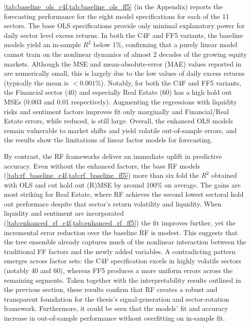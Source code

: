 \cref{tab:baseline_ols_c4f,tab:baseline_ols_ff5} (in the Appendix) reports the forecasting performance for the eight model specifications for each of the 11 sectors. The base OLS specifications provide only minimal explanatory power for daily sector level excess returns. In both the C4F and FF5 variants, the baseline models yield an in-sample $R^{2}$ below 1\%, confirming that a purely linear model cannot train on the nonlinear dynamics of almost 2 decades of the growing equity markets. Although the MSE and mean-absolute-error (MAE) values reported in  are numerically small, this is largely due to the low values of daily excess returns (typically the mean is  $<0.001\%$). Notably, for both the C4F and FF5 variants, the Financial sector (40) and especially Real Estate (60) has a high hold out MSEs (0.003 and 0.01 respectively). Augmenting the regressions with liquidity risks and sentiment factors  improves fit only marginally and Financial/Real Estate errors, while reduced, is still large. Overall, the enhanced OLS models remain vulnerable to market shifts and yield volatile out-of-sample errors, and the results show the limitations of linear factor models for forecasting.

By contrast, the RF frameworks deliver an immediate uplift in predictive accuracy. Even without the enhanced factors, the base RF models (\cref{tab:rf_baseline_c4f,tab:rf_baseline_ff5}) more than six fold the $R^{2}$ obtained with OLS and cut hold out (R)MSE by around 100\% on average. The gains are most striking for Real Estate, where RF achieves the second lowest sectoral hold out performace despite that sector's return volatility and liquidity. When liquidity and sentiment are incorporated (\cref{tab:enhanced_rf_c4f,tab:enhanced_rf_ff5}) the fit improves further, yet the incremental error reduction over the baseline RF is modest. This suggests that the tree ensemble already captures much of the nonlinear interaction between the traditional FF factors and the newly added variables. A contradicting pattern emerges across factor sets: the C4F specification excels in highly volatile sectors (notably 40 and 60), whereas FF5 produces a more uniform errors across the remaining segments. Taken together with the interpretability results outlined in the previous section, these results confirm that RF creates a robust and transparent foundation for the thesis's signal-generation and sector-rotation framework. Furthermore, it could be seen that the models' fit and accuracy increase in out-of-sample performance without overfitting on in-sample fit.


